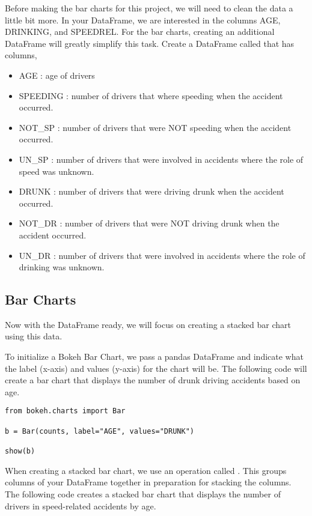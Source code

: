 \begin{problem}
Before making the bar charts for this project, we will need to clean the data a
little bit more. In your  DataFrame, we are interested in the columns
AGE, DRINKING, and SPEEDREL. For the bar charts, creating an additional DataFrame
will greatly simplify this task. Create a DataFrame called  that has
columns,
\begin{itemize}
    \item AGE : age of drivers
    \item SPEEDING : number of drivers that where speeding when the accident
                occurred.
    \item NOT\_SP : number of drivers that were NOT speeding when the accident
                occurred.
    \item UN\_SP : number of drivers that were involved in accidents where the
                role of speed was unknown.
    \item DRUNK : number of drivers that were driving drunk when the accident
                occurred.
    \item NOT\_DR : number of drivers that were NOT driving drunk when the
                accident occurred.
    \item UN\_DR : number of drivers that were involved in accidents where the
                role of drinking was unknown.
\end{itemize}
\end{problem}

\subsection*{Bar Charts}
Now with the  DataFrame ready, we will focus on creating a stacked
bar chart using this data.

To initialize a Bokeh Bar Chart, we pass a pandas DataFrame and indicate what
the label (x-axis) and values (y-axis) for the chart will be. The following
code will create a bar chart that displays the number of drunk driving accidents
based on age.

\begin{lstlisting}
from bokeh.charts import Bar

b = Bar(counts, label="AGE", values="DRUNK")

show(b)
\end{lstlisting}

When creating a stacked bar chart, we use an operation called . This
groups columns of your DataFrame together in preparation for stacking the
columns. The following code creates a stacked bar chart that displays the number
of drivers in speed-related accidents by age.

